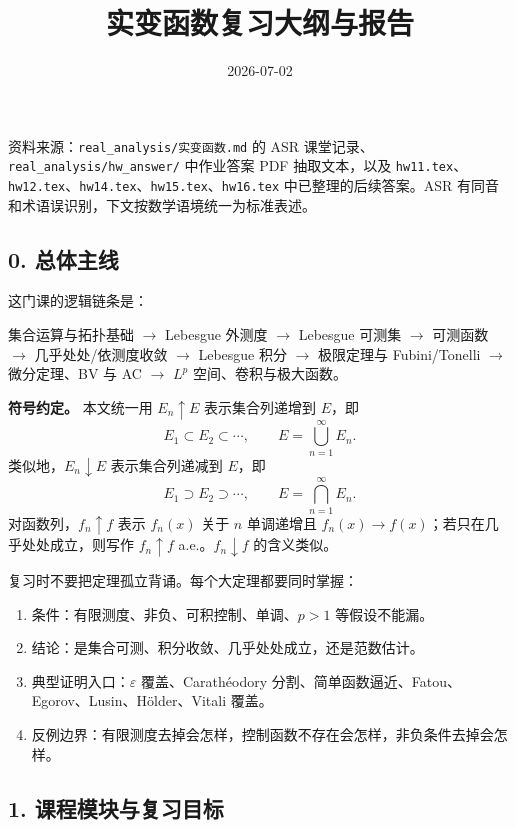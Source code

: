 \documentclass[
UTF8]{ctexart}
\title{实变函数复习大纲与报告}
\author{}
\date{2026-07-02}
\providecommand{\tightlist}{%
\setlength{\itemsep}{0pt}\setlength{\parskip}{0pt}}
\begin{document}
\pagestyle{plain}
\maketitle

{
  \setcounter{tocdepth}{3}
  \tableofcontents
}
\newpage
资料来源：\texttt{real\_analysis/实变函数.md} 的 ASR
课堂记录、\texttt{real\_analysis/hw\_answer/} 中作业答案 PDF
抽取文本，以及
\texttt{hw11.tex}、\texttt{hw12.tex}、\texttt{hw14.tex}、\texttt{hw15.tex}、\texttt{hw16.tex}
中已整理的后续答案。ASR
有同音和术语误识别，下文按数学语境统一为标准表述。

\subsection{0. 总体主线}\label{ux603bux4f53ux4e3bux7ebf}

这门课的逻辑链条是：

集合运算与拓扑基础 \(\to\) Lebesgue 外测度 \(\to\) Lebesgue 可测集
\(\to\) 可测函数 \(\to\) 几乎处处/依测度收敛 \(\to\) Lebesgue 积分
\(\to\) 极限定理与 Fubini/Tonelli \(\to\) 微分定理、BV 与 AC \(\to\)
\(L^p\) 空间、卷积与极大函数。

\textbf{符号约定。} 本文统一用 \(E_n\uparrow E\) 表示集合列递增到
\(E\)，即
\[
  E_1\subset E_2\subset\cdots,\qquad E=\bigcup_{n=1}^{\infty}E_n.
\]
类似地，\(E_n\downarrow E\) 表示集合列递减到 \(E\)，即
\[
  E_1\supset E_2\supset\cdots,\qquad E=\bigcap_{n=1}^{\infty}E_n.
\]
对函数列，\(f_n\uparrow f\) 表示 \(f_n(x)\) 关于 \(n\) 单调递增且
\(f_n(x)\to f(x)\)；若只在几乎处处成立，则写作 \(f_n\uparrow f\)
a.e.。\(f_n\downarrow f\) 的含义类似。

复习时不要把定理孤立背诵。每个大定理都要同时掌握：

\begin{enumerate}
    \def\labelenumi{\arabic{enumi}.}
    \tightlist
  \item
    条件：有限测度、非负、可积控制、单调、\(p>1\) 等假设不能漏。
  \item
    结论：是集合可测、积分收敛、几乎处处成立，还是范数估计。
  \item
    典型证明入口：\(\varepsilon\) 覆盖、Carathéodory
    分割、简单函数逼近、Fatou、Egorov、Lusin、Hölder、Vitali 覆盖。
  \item
    反例边界：有限测度去掉会怎样，控制函数不存在会怎样，非负条件去掉会怎样。
\end{enumerate}

\subsection{1.
课程模块与复习目标}\label{ux8bfeux7a0bux6a21ux5757ux4e0eux590dux4e60ux76eeux6807}
\end{document}

